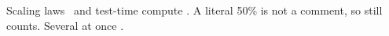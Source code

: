 \documentclass{article}
\begin{document}
Scaling laws~\citep{kaplan2020,hoffmann2022} and test-time compute \citet{snell2024}.
A literal 50\% is not a comment, so \cite{o1} still counts.
Several at once \citep[see][p.~3]{qwen2024, aime}.
\nocite{cesista2024}

\end{document}
